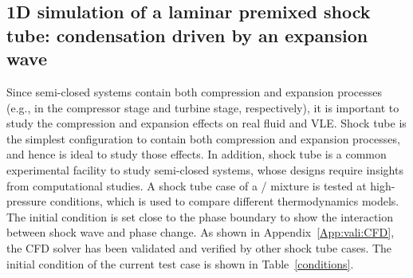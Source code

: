 \subsection{1D simulation of a laminar premixed  shock tube: condensation driven by an expansion wave}
\label{sec:results:ShockTube}
Since semi-closed  systems contain both compression and expansion processes (e.g., in the compressor stage and turbine stage, respectively), it is important to study the compression and expansion effects on real fluid and VLE. Shock tube is the simplest configuration to contain both compression and expansion processes, and hence is ideal to study those effects. In addition,  shock tube is a common experimental facility to study semi-closed  systems, whose designs require insights from computational studies. 
A shock tube case of a / mixture is tested at high-pressure conditions,
which is used to compare different thermodynamics models. The initial condition is set close to the phase boundary to show the interaction between shock wave and phase change.  %
As shown in Appendix~\ref{App:vali:CFD}, the CFD solver has been validated and verified by other shock tube cases. The initial condition of the current test case is shown in Table~\ref{conditions}.
